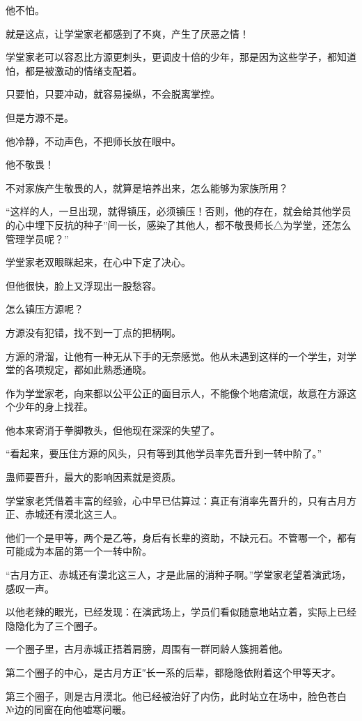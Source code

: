 \begin{this_body}
他不怕。

就是这点，让学堂家老都感到了不爽，产生了厌恶之情！

学堂家老可以容忍比方源更刺头，更调皮十倍的少年，那是因为这些学子，都知道怕，都是被激动的情绪支配着。

只要怕，只要冲动，就容易操纵，不会脱离掌控。

但是方源不是。

他冷静，不动声色，不把师长放在眼中。

他不敬畏！

不对家族产生敬畏的人，就算是培养出来，怎么能够为家族所用？

“这样的人，一旦出现，就得镇压，必须镇压！否则，他的存在，就会给其他学员的心中埋下反抗的种子”间一长，感染了其他人，都不敬畏师长△为学堂，还怎么管理学员呢？”

学堂家老双眼眯起来，在心中下定了决心。

但他很快，脸上又浮现出一股愁容。

怎么镇压方源呢？

方源没有犯错，找不到一丁点的把柄啊。

方源的滑溜，让他有一种无从下手的无奈感觉。他从未遇到这样的一个学生，对学堂的各项规定，都如此熟悉通晓。

作为学堂家老，向来都以公平公正的面目示人，不能像个地痞流氓，故意在方源这个少年的身上找茬。

他本来寄消于拳脚教头，但他现在深深的失望了。

“看起来，要压住方源的风头，只有等到其他学员率先晋升到一转中阶了。”

蛊师要晋升，最大的影响因素就是资质。

学堂家老凭借着丰富的经验，心中早已估算过：真正有消率先晋升的，只有古月方正、赤城还有漠北这三人。

他们一个是甲等，两个是乙等，身后有长辈的资助，不缺元石。不管哪一个，都有可能成为本届的第一个一转中阶。

“古月方正、赤城还有漠北这三人，才是此届的消种子啊。”学堂家老望着演武场，感叹一声。

以他老辣的眼光，已经发现：在演武场上，学员们看似随意地站立着，实际上已经隐隐化为了三个圈子。

一个圈子里，古月赤城正捂着肩膀，周围有一群同龄人簇拥着他。

第二个圈子的中心，是古月方正″长一系的后辈，都隐隐依附着这个甲等天才。

第三个圈子，则是古月漠北。他已经被治好了内伤，此时站立在场中，脸色苍白№边的同窗在向他嘘寒问暖。


\end{this_body}
